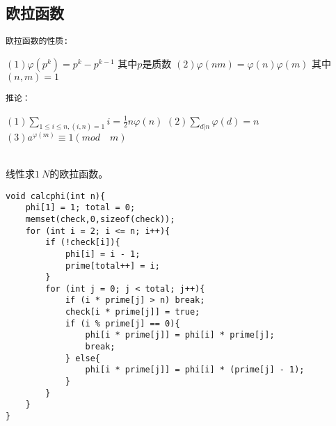 \subsection{欧拉函数}
\begin{verbatim}
欧拉函数的性质: 
\end{verbatim}
$(1) \varphi(p^k)=p^k-p^{k-1}$ \quad 其中$p$是质数 \newline
$(2) \varphi(nm)=\varphi(n)\varphi(m)$ \quad 其中$(n,m)=1$
\begin{verbatim}
推论：
\end{verbatim}
$(1)\sum_{1\leq i \leq n,(i,n)=1}{i}=\frac{1}{2} n\varphi(n)$ \newline
$(2)\sum_{d|n}{\varphi(d)}=n$ \newline
$(3)a^{\varphi(m)}\equiv 1(mod \quad m)$

~\\
线性求$1~N$的欧拉函数。\par
\begin{verbatim}
void calcphi(int n){
    phi[1] = 1; total = 0;
    memset(check,0,sizeof(check));
    for (int i = 2; i <= n; i++){
        if (!check[i]){
            phi[i] = i - 1;
            prime[total++] = i;
        }
        for (int j = 0; j < total; j++){
            if (i * prime[j] > n) break;
            check[i * prime[j]] = true;
            if (i % prime[j] == 0){
                phi[i * prime[j]] = phi[i] * prime[j];
                break;
            } else{
                phi[i * prime[j]] = phi[i] * (prime[j] - 1);
            }
        }
    }
}
\end{verbatim}
